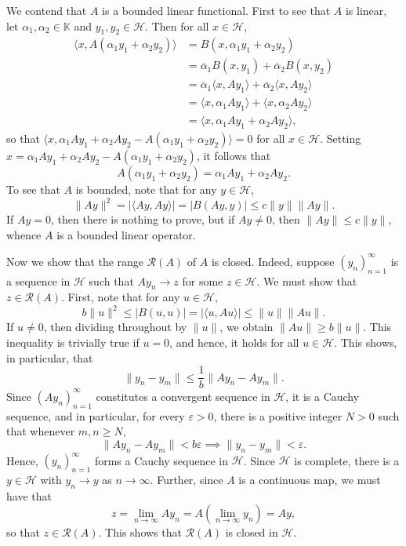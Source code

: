 \documentclass[11pt]{article}
\theoremstyle{thmstyle}
\theoremstyle{defstyle}
\newcommand{\R}{\mathbb{R}}
\newcommand{\bbC}{\mathbb{C}}
\newcommand{\K}{\mathbb{K}} %
\renewcommand{\le}{\leqslant}
\renewcommand{\ge}{\geqslant}
\newcommand{\calH}{\mathcal{H}}
\begin{document}
We contend that $A$ is a bounded linear functional. First to see that $A$ is linear, let $\alpha_1, \alpha_2\in\K$ and $y_1, y_2\in\calH$. Then for all $x\in\calH$, 
\begin{align*}
    \langle x, A(\alpha_1 y_1 + \alpha_2 y_2)\rangle &= B(x, \alpha_1y_1 + \alpha_2y_2)\\
    &= \overline\alpha_1 B(x, y_1) + \overline\alpha_2 B(x, y_2)\\
    &= \overline\alpha_1\langle x, Ay_1\rangle + \overline\alpha_2\langle x, Ay_2\rangle\\
    &= \langle x, \alpha_1 Ay_1\rangle + \langle x, \alpha_2 Ay_2\rangle\\
    &= \langle x, \alpha_1 Ay_1 + \alpha_2 Ay_2\rangle,
\end{align*}
so that $\langle x, \alpha_1 Ay_1 + \alpha_2 Ay_2 - A(\alpha_1 y_1 + \alpha_2 y_2)\rangle = 0$ for all $x\in\calH$. Setting $x = \alpha_1 Ay_1 + \alpha_2 Ay_2 - A(\alpha_1 y_1 + \alpha_2 y_2)$, it follows that 
\begin{equation*}
    A(\alpha_1y_1 + \alpha_2y_2) = \alpha_1 Ay_1 + \alpha_2 Ay_2.
\end{equation*}
To see that $A$ is bounded, note that for any $y\in\calH$, 
\begin{equation*}
    \|Ay\|^2 = \left|\langle Ay, Ay\rangle\right| = \left|B(Ay, y)\right|\le c\|y\|\|Ay\|.
\end{equation*}
If $Ay = 0$, then there is nothing to prove, but if $Ay\ne 0$, then $\|Ay\|\le c\|y\|$, whence $A$ is a bounded linear operator.

Now we show that the range $\mathcal R(A)$ of $A$ is closed. Indeed, suppose $(y_n)_{n = 1}^\infty$ is a sequence in $\calH$ such that $Ay_n\to z$ for some $z\in\calH$. We must show that $z\in\mathcal R(A)$. First, note that for any $u\in\calH$, 
\begin{equation*}
    b\|u\|^2\le\left|B(u, u)\right| = \left|\langle u, Au\rangle\right|\le \|u\|\|Au\|.
\end{equation*}
If $u\ne 0$, then dividing throughout by $\|u\|$, we obtain $\|Au\|\ge b\|u\|$. This inequality is trivially true if $u = 0$, and hence, it holds for all $u\in\calH$. This shows, in particular, that 
\begin{equation*}
    \|y_n - y_m\|\le \frac{1}{b}\|Ay_n - Ay_m\|.
\end{equation*}
Since $\left(Ay_n\right)_{n =1 }^\infty$ constitutes a convergent sequence in $\calH$, it is a Cauchy sequence, and in particular, for every $\varepsilon > 0$, there is a positive integer $N > 0$ such that whenever $m, n\ge N$, 
\begin{equation*}
    \|Ay_n - Ay_m\| < b\varepsilon\implies\|y_n - y_m\| < \varepsilon.
\end{equation*}
Hence, $(y_n)_{n = 1}^\infty$ forms a Cauchy sequence in $\calH$. Since $\calH$ is complete, there is a $y\in\calH$ with $y_n\to y$ as $n\to\infty$. Further, since $A$ is a continuous map, we must have that 
\begin{equation*}
    z = \lim_{n\to\infty} Ay_n = A\left(\lim_{n\to\infty}y_n\right) = Ay,
\end{equation*}
so that $z\in\mathcal R(A)$. This shows that $\mathcal R(A)$ is closed in $\calH$.
\end{document}
